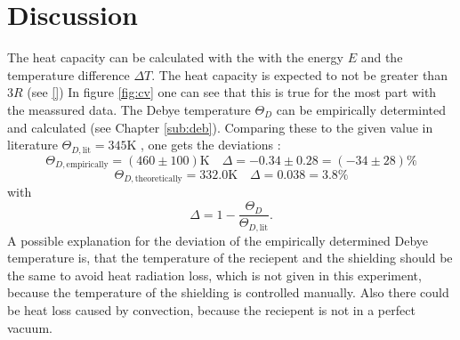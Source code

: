 \section{Discussion}
\label{sec:Diskussion}
The heat capacity can be calculated with the with the energy $E$ 
and the temperature difference $\Delta T$.
The heat capacity is expected to not be greater than $3 R$ (see \eqref{})
In figure \ref{fig:cv} one can see that this is true for the most part with the
meassured data.
\newline \newline
\noindent The Debye temperature $\Theta_D$ can be empirically determinted 
and calculated (see Chapter \ref{sub:deb}).
Comparing these to the given value in literature $\Theta_{D,\text{lit}} = 345 \si{\kelvin}$ \cite{deb_kupfer},
one gets the deviations :
\begin{equation*}
    \Theta_{D,\text{empirically}} =(460 \pm 100) \si{\kelvin}
    \quad \Delta =  -0.34 \pm 0.28 = (-34 \pm 28) \%
\end{equation*}
\begin{equation*}
    \Theta_{D,\text{theoretically}} = 332.0 \si{\kelvin}
    \quad \Delta = 0.038 = 3.8\%
\end{equation*}
with
\begin{equation*}
    \Delta = 1- \frac{\Theta_D}{\Theta_{D,\text{lit}} }.
\end{equation*}
\noindent A possible explanation
for the deviation of the empirically determined Debye temperature is, 
that the temperature of the reciepent and the shielding should be the same
to avoid heat radiation loss,
which is not given in this experiment,
because the temperature of the shielding is controlled manually.
Also there could be heat loss caused by convection, 
because the reciepent is not in a perfect vacuum.